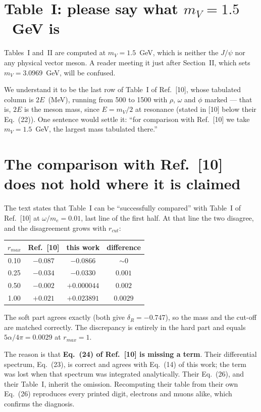 \documentclass[11pt]{article}
\begin{document}
\section{Table~I: please say what $m_V=1.5$~GeV is}

Tables~I and~II are computed at $m_V=1.5$~GeV, which is neither the $J/\psi$ nor
any physical vector meson. A reader meeting it just after Section~II, which sets
$m_V=3.0969$~GeV, will be confused.

We understand it to be the last row of Table~I of Ref.~[10], whose tabulated
column is $2E$~(MeV), running from 500 to 1500 with $\rho$, $\omega$ and $\phi$
marked --- that is, $2E$ is the meson mass, since $E=m_V/2$ at resonance (stated
in [10] below their Eq.~(22)). One sentence would settle it: ``for comparison
with Ref.~[10] we take $m_V=1.5$~GeV, the largest mass tabulated there.''

\section{The comparison with Ref.~[10] does not hold where it is claimed}

The text states that Table~I can be ``successfully compared'' with Table~I of
Ref.~[10] at $\omega/m_e=0.01$, last line of the first half. At that line the two
disagree, and the disagreement grows with $r_{cut}$:

\begin{center}
\begin{tabular}{cccc}
\toprule
$r_{max}$ & Ref.~[10] & this work & difference\\
\midrule
0.10 & $-0.087$ & $-0.0866$    & $\sim 0$\\
0.25 & $-0.034$ & $-0.0330$    & $0.001$\\
0.50 & $-0.002$ & $+0.000044$  & $0.002$\\
1.00 & $+0.021$ & $+0.023891$  & $0.0029$\\
\bottomrule
\end{tabular}
\end{center}

The soft part agrees exactly (both give $\delta_R=-0.747$), so the mass and the
cut-off are matched correctly. The discrepancy is entirely in the hard part and
equals $5\alpha/4\pi=0.0029$ at $r_{max}=1$.

The reason is that \textbf{Eq.~(24) of Ref.~[10] is missing a term}. Their
differential spectrum, Eq.~(23), is correct and agrees with Eq.~(14) of this
work; the term was lost when that spectrum was integrated analytically. Their
Eq.~(26), and their Table~I, inherit the omission. Recomputing their table from
their own Eq.~(26) reproduces every printed digit, electrons and muons alike,
which confirms the diagnosis.
\end{document}
